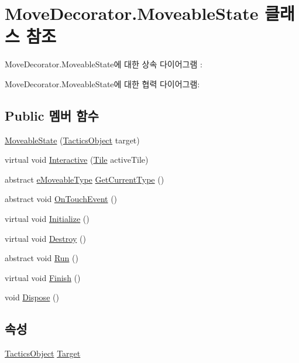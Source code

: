 \hypertarget{class_move_decorator_1_1_moveable_state}{}\section{Move\+Decorator.\+Moveable\+State 클래스 참조}
\label{class_move_decorator_1_1_moveable_state}


Move\+Decorator.\+Moveable\+State에 대한 상속 다이어그램 \+: 


Move\+Decorator.\+Moveable\+State에 대한 협력 다이어그램\+:
\subsection*{Public 멤버 함수}
\begin{DoxyCompactItemize}
\item 
\hyperlink{class_move_decorator_1_1_moveable_state_ae0130d6fdd6bb1dfd07a1f4c202dd6b0}{Moveable\+State} (\hyperlink{class_tactics_object}{Tactics\+Object} target)
\item 
virtual void \hyperlink{class_move_decorator_1_1_moveable_state_a1e66885aa7daf1021fc654b706b53ab8}{Interactive} (\hyperlink{class_tile}{Tile} active\+Tile)
\item 
abstract \hyperlink{_move_decorator_8cs_a90215797ba850e199f3ef63d7c56f132}{e\+Moveable\+Type} \hyperlink{class_move_decorator_1_1_moveable_state_a4759ac86dafc924c1de16e715c759ad6}{Get\+Current\+Type} ()
\item 
abstract void \hyperlink{class_move_decorator_1_1_moveable_state_a062a71b13cc331b5cfb805a2918e5ecc}{On\+Touch\+Event} ()
\item 
virtual void \hyperlink{class_m_c_n_1_1_state_a5be59bc891e64cbbe4322d74a6746908}{Initialize} ()
\item 
virtual void \hyperlink{class_m_c_n_1_1_state_aebf48ef248bbf185d6aae91d9789459e}{Destroy} ()
\item 
abstract void \hyperlink{class_m_c_n_1_1_state_afdec72a816a8a8ec584cac758a027215}{Run} ()
\item 
virtual void \hyperlink{class_m_c_n_1_1_state_a2492ca731678b8216c02134dddeeb745}{Finish} ()
\item 
void \hyperlink{class_m_c_n_1_1_state_af6df0477e0dead784489688cb2c2093e}{Dispose} ()
\end{DoxyCompactItemize}
\subsection*{속성}
\begin{DoxyCompactItemize}
\item 
\hyperlink{class_tactics_object}{Tactics\+Object} \hyperlink{class_m_c_n_1_1_state_a79a563b32f183c9adc9a96679fc57eb8}{Target}
\end{DoxyCompactItemize}


